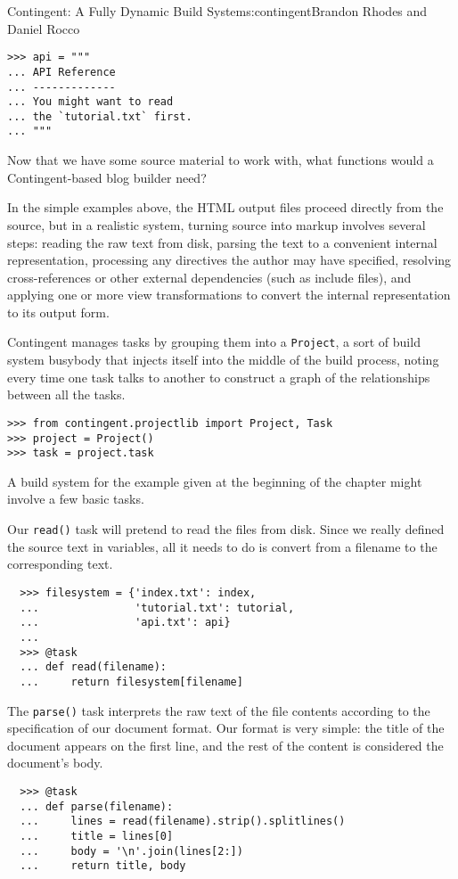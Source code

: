 \begin{aosachapter}{Contingent: A Fully Dynamic Build System}{s:contingent}{Brandon Rhodes and Daniel Rocco}
\begin{verbatim}
>>> api = """
... API Reference
... -------------
... You might want to read
... the `tutorial.txt` first.
... """
\end{verbatim}

Now that we have some source material to work with, what functions would
a Contingent-based blog builder need?

In the simple examples above, the HTML output files proceed directly
from the source, but in a realistic system, turning source into markup
involves several steps: reading the raw text from disk, parsing the text
to a convenient internal representation, processing any directives the
author may have specified, resolving cross-references or other external
dependencies (such as include files), and applying one or more view
transformations to convert the internal representation to its output
form.

Contingent manages tasks by grouping them into a \texttt{Project}, a
sort of build system busybody that injects itself into the middle of the
build process, noting every time one task talks to another to construct
a graph of the relationships between all the tasks.

\begin{verbatim}
>>> from contingent.projectlib import Project, Task
>>> project = Project()
>>> task = project.task
\end{verbatim}

A build system for the example given at the beginning of the chapter
might involve a few basic tasks.

Our \texttt{read()} task will pretend to read the files from disk. Since
we really defined the source text in variables, all it needs to do is
convert from a filename to the corresponding text.

\begin{verbatim}
  >>> filesystem = {'index.txt': index,
  ...               'tutorial.txt': tutorial,
  ...               'api.txt': api}
  ...
  >>> @task
  ... def read(filename):
  ...     return filesystem[filename]
\end{verbatim}

The \texttt{parse()} task interprets the raw text of the file contents
according to the specification of our document format. Our format is
very simple: the title of the document appears on the first line, and
the rest of the content is considered the document's body.

\begin{verbatim}
  >>> @task
  ... def parse(filename):
  ...     lines = read(filename).strip().splitlines()
  ...     title = lines[0]
  ...     body = '\n'.join(lines[2:])
  ...     return title, body
\end{verbatim}


\end{aosachapter}
